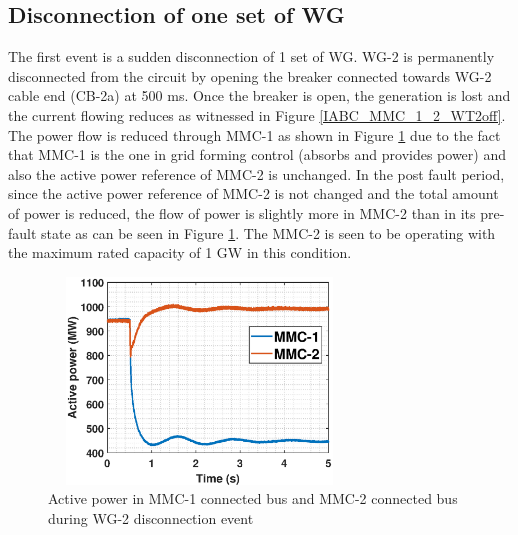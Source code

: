 \subsection{Disconnection of one set of WG}
The first event is a sudden disconnection of 1 set of \gls{WG}. \gls{WG}-2 is permanently disconnected from the circuit by opening the breaker connected towards \gls{WG}-2 cable end (CB-2a) at 500 ms. Once the breaker is open, the generation is lost and the current flowing reduces as witnessed in Figure \ref{IABC_MMC_1_2_WT2off}. The power flow is reduced through \gls{MMC}-1 as shown in Figure \ref{P_MMC_1_2_WT2off} due to the fact that \gls{MMC}-1 is the one in grid forming control (absorbs and provides power) and also the active power reference of \gls{MMC}-2 is unchanged.
In the post fault period, since the active power reference of \gls{MMC}-2 is not changed and the total amount of power is reduced, the flow of power is slightly more in \gls{MMC}-2 than in its pre-fault state as can be seen in Figure \ref{P_MMC_1_2_WT2off}. The \gls{MMC}-2 is seen to be operating with the maximum rated capacity of 1 GW in this condition.

\begin{figure}[H]
\centering
    \includegraphics[height = 5.5cm,width = 8cm]{Diagrams/Chapter_5/P_MMC_1_2_WT2off.eps}
    \caption{Active power in MMC-1 connected bus and MMC-2 connected bus during WG-2 disconnection event}
    \label{P_MMC_1_2_WT2off}
\end{figure}

